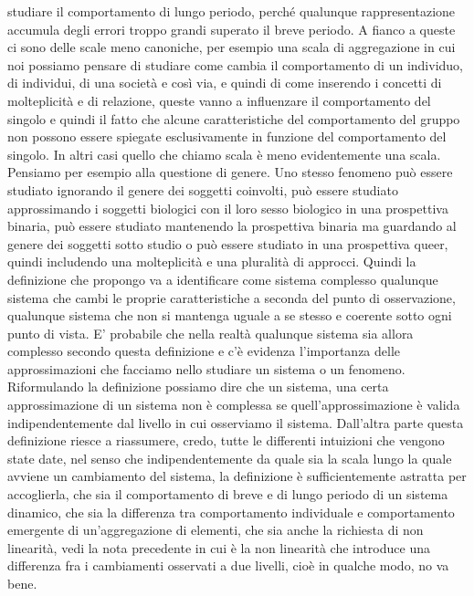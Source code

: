 \documentclass[a4paper, headings=standardclasses]{scrartcl}
\begin{document}
studiare il comportamento di lungo periodo, perché qualunque rappresentazione accumula
degli errori troppo grandi superato il breve periodo.
A fianco a queste ci sono delle scale meno canoniche, per esempio una scala di aggregazione
in cui noi possiamo pensare di studiare come cambia il comportamento di un individuo, di
individui, di una società e così via, e quindi di come inserendo i concetti di molteplicità
e di relazione, queste vanno a influenzare il comportamento del singolo e quindi il fatto
che alcune caratteristiche del comportamento del gruppo non possono essere spiegate esclusivamente
in funzione del comportamento del singolo.
In altri casi quello che chiamo scala è meno evidentemente una scala.
Pensiamo per esempio alla questione di genere.
Uno stesso fenomeno può essere studiato ignorando il genere dei soggetti coinvolti, può essere
studiato approssimando i soggetti biologici con il loro sesso biologico in una prospettiva
binaria, può essere studiato mantenendo la prospettiva binaria ma guardando al genere
dei soggetti sotto studio o può essere studiato in una prospettiva queer, quindi includendo
una molteplicità e una pluralità di approcci.
Quindi la definizione che propongo va a identificare come sistema complesso qualunque sistema che
cambi le proprie caratteristiche a seconda del punto di osservazione, qualunque sistema
che non si mantenga uguale a se stesso e coerente sotto ogni punto di vista.
E' probabile che nella realtà qualunque sistema sia allora complesso secondo questa
definizione e c'è evidenza l'importanza delle approssimazioni che facciamo nello studiare
un sistema o un fenomeno.
Riformulando la definizione possiamo dire che un sistema, una certa approssimazione
di un sistema non è complessa se quell'approssimazione è valida indipendentemente dal livello in
cui osserviamo il sistema.
Dall'altra parte
questa definizione riesce a riassumere, credo, tutte le differenti intuizioni che vengono
state date, nel senso che indipendentemente da quale sia la scala lungo la quale avviene
un cambiamento del sistema, la definizione è sufficientemente astratta per accoglierla,
che sia il comportamento di breve e di lungo periodo di un sistema dinamico, che sia la
differenza tra comportamento individuale e comportamento emergente di un'aggregazione
di elementi, che sia anche la richiesta di non linearità, vedi la nota precedente in
cui è la non linearità che introduce una differenza fra i cambiamenti
osservati a due livelli, cioè in qualche modo, no va bene.
\end{document}
